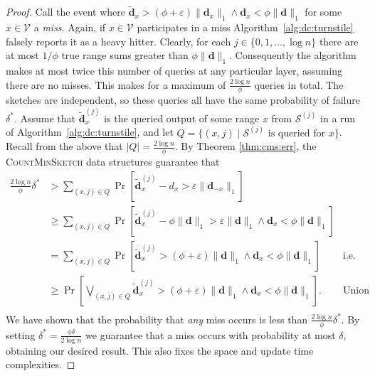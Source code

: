 \documentclass[10]{report}
\newcommand{\algoname}[1]{\textnormal{\textsc{#1}}}
\begin{document}
\begin{proof}
Call the event where $\widetilde{\mathbf{d}}_x > (\phi + \varepsilon) \|\mathbf{d}_{x}\|_1 \wedge \mathbf{d}_x < \phi \|\mathbf{d}\|_1$ for some $x \in \mathcal{V}$ a \emph{miss}.
Again, if $x \in \mathcal{V}$ participates in a miss Algorithm~\ref{alg:dc:turnstile} falsely reports it as a heavy hitter.
Clearly, for each $j \in \{0, 1, \dots, \log n\}$ there are at most $1/\phi$ true range sums greater than $\phi \|\mathbf{d}\|_1$. 
Consequently the algorithm makes at most twice this number of queries at any particular layer, assuming there are no misses. 
This makes for a maximum of $\frac {2 \log n}{\phi}$ queries in total. 
The sketches are independent, so these queries all have the same probability of failure $\delta^*$.
Assume that $\widetilde{\mathbf{d}}_x^{(j)}$ is the queried output of some range $x$ from $\mathcal{S}^{(j)}$ in a run of Algorithm~\ref{alg:dc:turnstile}, and 
let $Q = \{(x, j) \mid \mathcal{S}^{(j)} \text{ is queried for $x$}\}$.
Recall from the above that $|Q| = \frac{2 \log n}{\phi}$.
By Theorem \ref{thm:cms:err}, the \algoname{CountMinSketch} data structures guarantee that
%
\begin{align*}
\frac{2\log n}{\phi}\delta^*
&>
\sum_{(x, j) \in Q} \Pr \left [ \widetilde{\mathbf{d}}_x^{(j)} - d_x > \varepsilon \|\mathbf{d}_{-x}\|_1 \right ] 
& \\
&\geq
\sum_{(x, j) \in Q} \Pr \left [ \widetilde{\mathbf{d}}_x^{(j)} - \phi\|\mathbf{d}\|_1 > \varepsilon \|\mathbf{d}\|_1 \wedge \mathbf{d}_x < \phi \|\mathbf{d}\|_1 \right ] 
& \\
&=
\sum_{(x, j) \in Q} \Pr \left [ \widetilde{\mathbf{d}}_x^{(j)} > (\phi + \varepsilon) \|\mathbf{d}\|_1 \wedge \mathbf{d}_x < \phi \|\mathbf{d}\|_1 \right ] 
& \text{i.e. sum of misses}  \\
&\geq
\Pr \left [ \bigvee_{(x, j) \in Q} \widetilde{\mathbf{d}}_x^{(j)} > (\phi + \varepsilon) \|\mathbf{d}\|_1 \wedge \mathbf{d}_x < \phi \|\mathbf{d}\|_1 \right ].
& \text{Union bound} \\
\end{align*}
We have shown that the probability that \emph{any} miss occurs is less than $\frac{2\log n}{\phi}\delta^*$.
By setting $\delta^* = \frac{\phi\delta}{2\log n}$ we guarantee that a miss occurs with probability at most $\delta$, obtaining our desired result.
This also fixes the space and update time complexities.
\end{proof}
\end{document}
